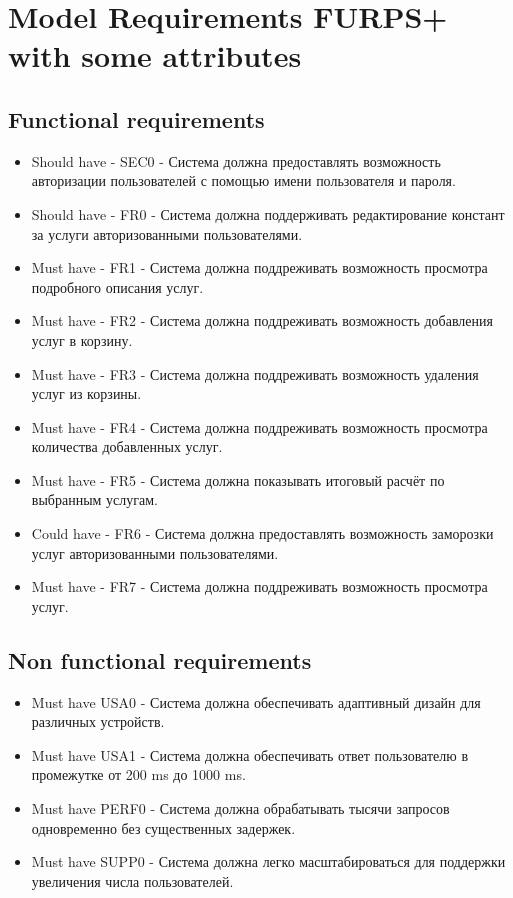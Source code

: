 \documentclass{article}
\begin{document}
\section{Model Requirements FURPS+ with some attributes}

\subsection{Functional requirements}
\begin{itemize}
    \item Should have - SEC0 - Система должна предоставлять возможность авторизации пользователей с помощью имени пользователя и пароля.
    \item Should have - FR0 - Система должна поддерживать редактирование констант за услуги авторизованными пользователями.
    \item Must have - FR1 - Система должна поддреживать возможность просмотра подробного описания услуг.
    \item Must have - FR2 - Система должна поддреживать возможность добавления услуг в корзину.
    \item Must have - FR3 - Система должна поддреживать возможность удаления услуг из корзины.
    \item Must have - FR4 - Система должна поддреживать возможность просмотра количества добавленных услуг.
    \item Must have - FR5 - Система должна показывать итоговый расчёт по выбранным услугам.
    \item Could have - FR6 - Система должна предоставлять возможность заморозки услуг авторизованными пользователями.
    \item Must have - FR7 - Система должна поддреживать возможность просмотра услуг.
\end{itemize}
\subsection{Non functional requirements}
\begin{itemize} 
    \item Must have USA0 - Система должна обеспечивать адаптивный дизайн для различных устройств.
    \item Must have USA1 - Система должна обеспечивать ответ пользователю в промежутке от 200 ms до 1000 ms.
    \item Must have PERF0 - Система должна обрабатывать тысячи запросов одновременно без существенных задержек.
    \item Must have SUPP0 - Система должна легко масштабироваться для поддержки увеличения числа пользователей.
\end{itemize}
\end{document}
